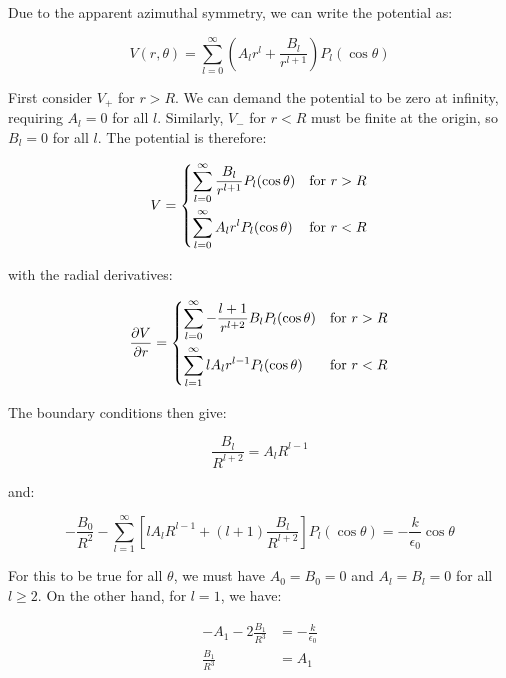 \documentclass[12pt]{article}
\begin{document}
Due to the apparent azimuthal symmetry, we can write the potential as:

\begin{equation}
    V(r, \theta) = \sum_{l=0}^{\infty} \left( A_{l} r^{l} + \frac{B_{l}}{r^{l+1}} \right) P_{l}(\cos{\theta})
\end{equation}

First consider $V_{+}$ for $r > R$. We can demand the potential to be zero at infinity, requiring $A_{l} = 0$ for all $l$. Similarly, $V_{-}$ for $r < R$ must be finite at the origin, so $B_{l} = 0$ for all $l$. The potential is therefore:

\begin{equation}
    V =
    \begin{dcases}
        \sum_{l=0}^{\infty} \frac{B_{l}}{r^{l+1}} P_{l}(\cos{\theta}) & \text{for } r > R \\
        \sum_{l=0}^{\infty} A_{l} r^{l} P_{l}(\cos{\theta})           & \text{for } r < R
    \end{dcases}
\end{equation}

with the radial derivatives:

\begin{equation}
    \frac{\partial V}{\partial r} =
    \begin{dcases}
        \sum_{l=0}^{\infty} -\frac{l+1}{r^{l+2}} B_{l} P_{l}(\cos{\theta}) & \text{for } r > R \\
        \sum_{l=1}^{\infty} l A_{l} r^{l-1} P_{l}(\cos{\theta})            & \text{for } r < R
    \end{dcases}
\end{equation}

The boundary conditions then give:

\begin{equation}
    \frac{B_{l}}{R^{l+2}} = A_{l} R^{l-1}
\end{equation}

and:

\begin{equation}
    -\frac{B_{0}}{R^{2}} - \sum_{l=1}^{\infty} \left[ l A_{l} R^{l-1} + (l + 1)\frac{B_{l}}{R^{l+2}} \right] P_{l}(\cos{\theta}) = -\frac{k}{\epsilon_{0}} \cos{\theta}
\end{equation}

For this to be true for all $\theta$, we must have $A_{0} = B_{0} = 0$ and $A_{l} = B_{l} = 0$ for all $l \ge 2$. On the other hand, for $l = 1$, we have:

\begin{equation}
    \begin{split}
        -A_{1} - 2\frac{B_{1}}{R^{3}} &= -\frac{k}{\epsilon_{0}} \\
        \frac{B_{1}}{R^{3}} &= A_{1}
    \end{split}
\end{equation}
\end{document}
